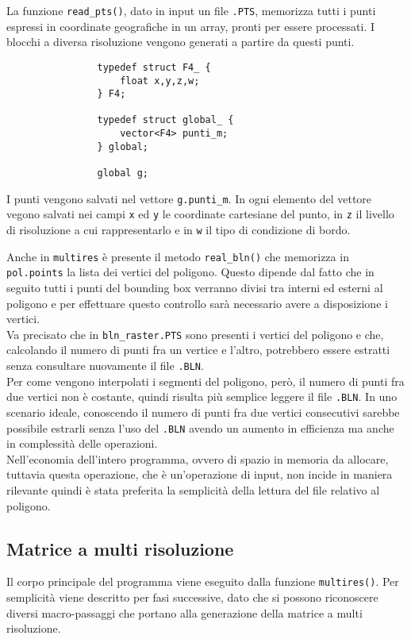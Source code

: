 			La funzione \texttt{read\_pts()}, dato in input un file \texttt{.PTS}, memorizza tutti i punti espressi in coordinate geografiche in un array, pronti per essere processati. I blocchi a diversa risoluzione vengono generati a partire da questi punti.
			\begin{verbatim}
				typedef struct F4_ {
				    float x,y,z,w;
				} F4;

				typedef struct global_ {
				    vector<F4> punti_m;
				} global;

				global g;
			\end{verbatim}
			I punti vengono salvati nel vettore \texttt{g.punti\_m}. In ogni elemento del vettore vegono salvati nei campi \texttt{x} ed \texttt{y} le coordinate cartesiane del punto, in \texttt{z} il livello di risoluzione a cui rappresentarlo e in \texttt{w} il tipo di condizione di bordo. 

			Anche in \texttt{multires} \`{e} presente il metodo \texttt{real\_bln()} che memorizza in \texttt{pol.points} la lista dei vertici del poligono. Questo dipende dal fatto che in seguito tutti i punti del bounding box verranno divisi tra interni ed esterni al poligono e per effettuare questo controllo sar\`{a} necessario avere a disposizione i vertici.\\
			Va precisato che in \texttt{bln\_raster.PTS} sono presenti i vertici del poligono e che, calcolando il numero di punti fra un vertice e l'altro, potrebbero essere estratti senza consultare nuovamente il file \texttt{.BLN}.\\
			Per come vengono interpolati i segmenti del poligono, per\`{o}, il numero di punti fra due vertici non \`{e} costante, quindi risulta pi\`{u} semplice leggere il file \texttt{.BLN}.
			In uno scenario ideale, conoscendo il numero di punti fra due vertici consecutivi sarebbe possibile estrarli senza l'uso del \texttt{.BLN} avendo un aumento in efficienza ma anche in complessit\`{a} delle operazioni. \\
			Nell'economia dell'intero programma, ovvero di spazio in memoria da allocare, tuttavia questa operazione, che \`{e} un'operazione di input, non incide in maniera rilevante quindi \`{e} stata preferita la semplicit\`{a} della lettura del file relativo al poligono. 

		\subsection{Matrice a multi risoluzione}
			Il corpo principale del programma viene eseguito dalla funzione \texttt{multires()}. Per semplicit\`{a} viene descritto per fasi successive, dato che si possono riconoscere diversi macro-passaggi che portano alla generazione della matrice a multi risoluzione.
